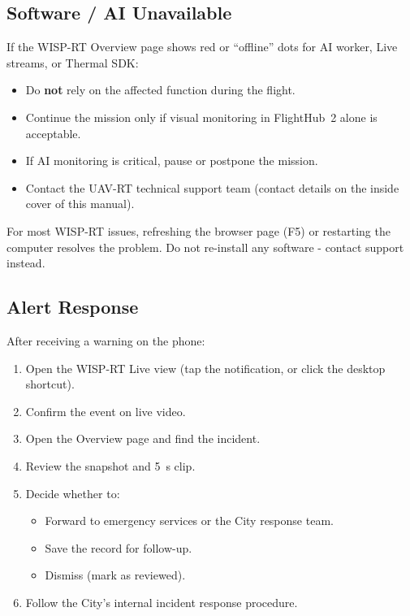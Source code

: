 \documentclass[11pt,letterpaper]{article}
\begin{document}
\subsection{Software / AI Unavailable}

If the WISP-RT Overview page shows red or ``offline'' dots for AI worker,
Live streams, or Thermal SDK:

\begin{itemize}[leftmargin=1.5em]
  \item Do \textbf{not} rely on the affected function during the flight.
  \item Continue the mission only if visual monitoring in FlightHub~2 alone is acceptable.
  \item If AI monitoring is critical, pause or postpone the mission.
  \item Contact the UAV-RT technical support team (contact details on the
        inside cover of this manual).
\end{itemize}

\begin{tipbox}
For most WISP-RT issues, refreshing the browser page (F5) or restarting the
computer resolves the problem. Do not re-install any software - contact
support instead.
\end{tipbox}

\subsection{Alert Response}

After receiving a warning on the phone:

\begin{enumerate}[leftmargin=1.5em]
  \item Open the WISP-RT Live view (tap the notification, or click the desktop shortcut).
  \item Confirm the event on live video.
  \item Open the Overview page and find the incident.
  \item Review the snapshot and 5~s clip.
  \item Decide whether to:
    \begin{itemize}[leftmargin=1.2em]
      \item Forward to emergency services or the City response team.
      \item Save the record for follow-up.
      \item Dismiss (mark as reviewed).
    \end{itemize}
  \item Follow the City's internal incident response procedure.
\end{enumerate}
\end{document}
